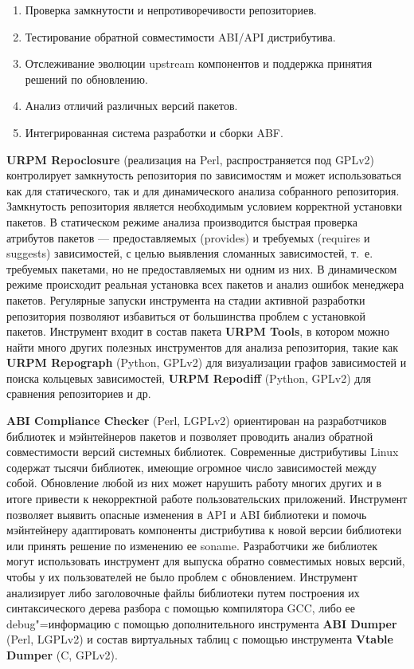 \documentclass[10pt, a5paper]{article}
\begin{document}
\begin{enumerate}
  \item Проверка замкнутости и непротиворечивости репозиториев.
  \item Тестирование обратной совместимости ABI/API дистрибутива.
  \item Отслеживание эволюции upstream компонентов и поддержка принятия решений по обновлению.
  \item Анализ отличий различных версий пакетов.
  \item Интегрированная система разработки и сборки ABF.
\end{enumerate}

\textbf{URPM Repoclosure} (реализация на Perl, распространяется под GPLv2) контролирует замкнутость репозитория по зависимостям и может использоваться как для статического, так и для динамического анализа собранного репозитория. Замкнутость репозитория является необходимым условием корректной установки пакетов. В статическом режиме анализа производится быстрая проверка атрибутов пакетов — предоставляемых (provides) и требуемых (requires и suggests) зависимостей, с целью выявления сломанных зависимостей, т.~е. требуемых пакетами, но не предоставляемых ни одним из них. В динамическом режиме происходит реальная установка всех пакетов и анализ ошибок менеджера пакетов. Регулярные запуски инструмента на стадии активной разработки репозитория позволяют избавиться от большинства проблем с установкой пакетов. Инструмент входит в состав пакета \textbf{URPM Tools}, в котором можно найти много других полезных инструментов для анализа репозитория, такие как \textbf{URPM Repograph} (Python, GPLv2) для визуализации графов зависимостей и поиска кольцевых зависимостей, \textbf{URPM Repodiff} (Python, GPLv2) для сравнения репозиториев и др.

\textbf{ABI Compliance Checker} (Perl, LGPLv2) ориентирован на разработчиков библиотек и мэйнтейнеров пакетов и позволяет проводить анализ обратной совместимости версий системных библиотек. Современные дистрибутивы Linux содержат тысячи библиотек, имеющие огромное число зависимостей между собой. Обновление любой из них может нарушить работу многих других и в итоге привести к некорректной работе пользовательских приложений. Инструмент позволяет выявить опасные изменения в API и ABI библиотеки и помочь мэйнтейнеру адаптировать компоненты дистрибутива к новой версии библиотеки или принять решение по изменению ее soname. Разработчики же библиотек могут использовать инструмент для выпуска обратно совместимых новых версий, чтобы у их пользователей не было проблем с обновлением. Инструмент анализирует либо заголовочные файлы библиотеки путем построения их синтаксического дерева разбора с помощью компилятора GCC, либо ее debug"=информацию с помощью дополнительного инструмента \textbf{ABI Dumper} (Perl, LGPLv2) и состав виртуальных таблиц с помощью инструмента \textbf{Vtable Dumper} (C, GPLv2).
\end{document}
